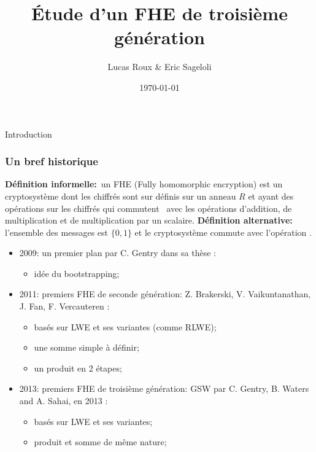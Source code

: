 \documentclass[10pt,xcolor={usenames,dvipsnames}]{beamer}
\title{\'Etude d'un FHE de troisième génération}
\date{\today}
\author{Lucas Roux \& Eric Sageloli}
\begin{document}
 \begin{frame} 
 \maketitle
 \end{frame}


 \begin{frame} 
 \tableofcontents
 \end{frame}

\begin{section}{Introduction}

 \begin{frame} 
 \frametitle{Un bref historique}
\textbf{Définition informelle:} un FHE (Fully homomorphic encryption) est un cryptosystème dont les chiffrés 
 sont sur définis sur un anneau $R$ et ayant des opérations sur les chiffrés qui 
 \og commutent \fg~avec les opérations 
 d'addition, de multiplication et de multiplication par un scalaire. 
\textbf{Définition alternative:} l'ensemble des messages est $\{0,1\}$ et le cryptosystème commute  
avec l'opération .
\pause
\begin{itemize}
\item 2009: un premier plan par C. Gentry dans sa thèse :
\begin{itemize}
\item idée du bootstrapping;
\end{itemize}
\item 2011: premiers FHE de seconde génération: Z. Brakerski,  V. \nolinebreak Vaikuntanathan, J. Fan, F. Vercauteren :
	\begin{itemize}
	\item basés sur LWE et ses variantes (comme RLWE);
	\item une somme simple à définir;
	\item un produit en 2 étapes;
	\end{itemize}
\item 2013: premiers FHE de troisième génération: GSW par C. Gentry, B. Waters and A. Sahai, en 2013 :
	\begin{itemize}
	\item basés sur LWE et ses variantes;
	\item produit et somme de même nature;
	\end{itemize}
\end{itemize}
\end{frame} 

\end{section}
\end{document}
